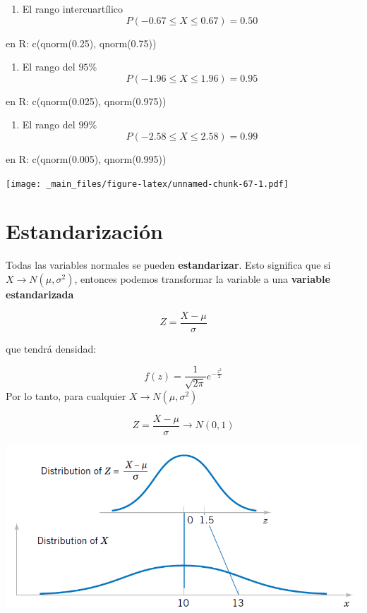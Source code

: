 \documentclass[
]{book}
\providecommand{\tightlist}{%
  \setlength{\itemsep}{0pt}\setlength{\parskip}{0pt}}
\begin{document}
\begin{enumerate}
\def\labelenumi{\arabic{enumi})}
\tightlist
\item
  El rango intercuartílico \[P(-0.67 \leq X \leq 0.67)=0.50\]
\end{enumerate}

en R: c(qnorm(0.25), qnorm(0.75))

\begin{enumerate}
\def\labelenumi{\arabic{enumi})}
\setcounter{enumi}{1}
\tightlist
\item
  El rango del \(95\%\) \[P(-1.96 \leq X \leq 1.96)=0.95\]
\end{enumerate}

en R: c(qnorm(0.025), qnorm(0.975))

\begin{enumerate}
\def\labelenumi{\arabic{enumi})}
\setcounter{enumi}{2}
\tightlist
\item
  El rango del \(99\%\) \[P(-2.58 \leq X \leq 2.58)=0.99\]
\end{enumerate}

en R: c(qnorm(0.005), qnorm(0.995))

\texttt{[image: \_main\_files/figure-latex/unnamed-chunk-67-1.pdf]}

\hypertarget{estandarizaciuxf3n}{%
\section{Estandarización}\label{estandarizaciuxf3n}}

Todas las variables normales se pueden \textbf{estandarizar}. Esto significa que si \(X \rightarrow N(\mu, \sigma^2)\), entonces podemos transformar la variable a
una \textbf{variable estandarizada}

\[Z=\frac{X-\mu}{\sigma}\]

que tendrá densidad:

\[f(z)=\frac{1}{ \sqrt{2\pi}}e^{-\frac{z^2}{2}}\]
Por lo tanto, para cualquier \(X \rightarrow N(\mu, \sigma^2)\)

\[Z=\frac{X-\mu}{\sigma} \rightarrow N(0, 1) \]

\includegraphics{./figures/stand.png}
\end{document}
